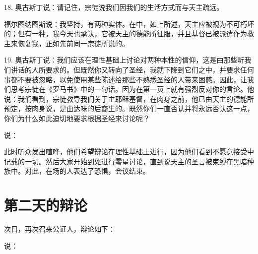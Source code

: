 18. 奥古斯丁说：请记住，宗徒说我们因我们的生活方式而与天主疏远。\par

福尔图纳图斯说：我坚持，有两种实体。在中，如上所述，天主应被视为不可朽坏的；但有一种，我今天也承认，它被天主的德能所征服，并且基督已被派遣作为救主来恢复我，正如先前同一宗徒所说的。\par

19. 奥古斯丁说：我们应该在理性基础上讨论对两种本性的信仰，这是由那些听我们讲话的人所要求的。但既然你又转向了圣经，我就下降到它们之中，并要求任何事都不要被忽略，以免使用某些陈述给那些不熟悉圣经的人带来困惑。因此，让我们思考宗徒在《罗马书》中的一句话。因为在第一页上就有强烈反对你的言论。他说：我们看到，宗徒教导我们关于主耶稣基督，在肉身之前，他已由天主的德能所预定，按肉身说，是由达味的后裔生的。既然你们一直否认并将永远否认这一点，你们为什么如此迫切地要求根据圣经来讨论呢？\par

说：\par

此时听众发出喧哗，他们希望辩论在理性基础上进行，因为他们看到不愿意接受中记载的一切。然后大家开始到处进行零星讨论，直到说天主的圣言被束缚在黑暗种族中。对此，在场的人表达了恐惧，会议结束。\par


\section{第二天的辩论}

次日，再次召来公证人，辩论如下：\par

说：\par

